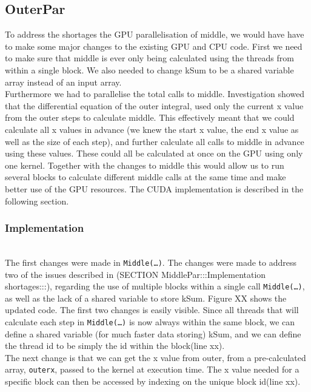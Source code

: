 \subsection{OuterPar}
To address the shortages the GPU parallelisation of middle, we would have have to make some major changes to the existing GPU and CPU code. First we need to make sure that middle is ever only being calculated using the threads from within a single block. We also needed to change kSum to be a shared variable array instead of an input array. \\

Furthermore we had to parallelise the total calls to middle. Investigation showed that the differential equation of the outer integral, used only the current x value from the outer steps to calculate middle. This effectively meant that we could calculate all x values in advance (we knew the start x value, the end x value as well as the size of each step), and further calculate all calls to middle in advance using these values. These could all be calculated at once on the GPU using only one kernel. Together with the changes to middle this would allow us to run several blocks to calculate different middle calls at the same time and make better use of the GPU resources. The CUDA implementation is described in the following section.

\subsubsection{Implementation} \hfill \\
The first changes were made in \texttt{Middle(…)}. The changes were made to address two of the issues described in (SECTION MiddlePar:::Implementation shortages:::), regarding the use of multiple blocks within a single call \texttt{Middle(…)}, as well as the lack of a shared variable to store kSum. Figure XX shows the updated code. The first two changes is easily  visible. Since all threads that will calculate each step in \texttt{Middle(…)} is now always within the same block, we can define a shared variable (for much faster data storing) kSum, and we can define the thread id to be simply the id within the block(line xx).\\

The next change is that we can get the x value from outer, from a pre-calculated array, \texttt{outerx}, passed to the kernel at execution time. The x value needed for a specific block can then be accessed by indexing on the unique block id(line xx).\\


